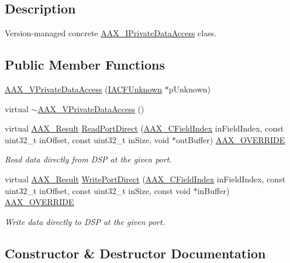 \subsection{Description}
Version-\/managed concrete \hyperlink{a00111}{A\+A\+X\+\_\+\+I\+Private\+Data\+Access} class. \subsection*{Public Member Functions}
\begin{DoxyCompactItemize}
\item 
\hyperlink{a00139_a5a7e43df303b7828d244026016ff1af9}{A\+A\+X\+\_\+\+V\+Private\+Data\+Access} (\hyperlink{a00146}{I\+A\+C\+F\+Unknown} $\ast$p\+Unknown)
\item 
virtual \hyperlink{a00139_a017d1c89918de3bd45300caa0ec110f3}{$\sim$\+A\+A\+X\+\_\+\+V\+Private\+Data\+Access} ()
\item 
virtual \hyperlink{a00149_a4d8f69a697df7f70c3a8e9b8ee130d2f}{A\+A\+X\+\_\+\+Result} \hyperlink{a00139_a49753540b03990f4e98d306769e3371e}{Read\+Port\+Direct} (\hyperlink{a00149_ae807f8986143820cfb5d6da32165c9c7}{A\+A\+X\+\_\+\+C\+Field\+Index} in\+Field\+Index, const uint32\+\_\+t in\+Offset, const uint32\+\_\+t in\+Size, void $\ast$out\+Buffer) \hyperlink{a00149_ac2f24a5172689ae684344abdcce55463}{A\+A\+X\+\_\+\+O\+V\+E\+R\+R\+I\+D\+E}
\begin{DoxyCompactList}\small\item\em Read data directly from D\+S\+P at the given port. \end{DoxyCompactList}\item 
virtual \hyperlink{a00149_a4d8f69a697df7f70c3a8e9b8ee130d2f}{A\+A\+X\+\_\+\+Result} \hyperlink{a00139_a71477a9117a9e432acfa3e9e27037904}{Write\+Port\+Direct} (\hyperlink{a00149_ae807f8986143820cfb5d6da32165c9c7}{A\+A\+X\+\_\+\+C\+Field\+Index} in\+Field\+Index, const uint32\+\_\+t in\+Offset, const uint32\+\_\+t in\+Size, const void $\ast$in\+Buffer) \hyperlink{a00149_ac2f24a5172689ae684344abdcce55463}{A\+A\+X\+\_\+\+O\+V\+E\+R\+R\+I\+D\+E}
\begin{DoxyCompactList}\small\item\em Write data directly to D\+S\+P at the given port. \end{DoxyCompactList}\end{DoxyCompactItemize}


\subsection{Constructor \& Destructor Documentation}
\hypertarget{a00139_a5a7e43df303b7828d244026016ff1af9}{}
